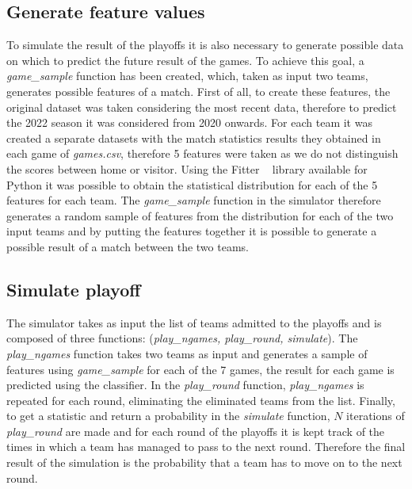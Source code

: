 \documentclass{article}
\begin{document}
\subsection{Generate feature values}
To simulate the result of the playoffs it is also necessary to generate possible data on which to predict the future result of the games. To achieve this goal, a \emph{game\_sample} function has been created, which, taken as input two teams, generates possible features of a match. First of all, to create these features, the original dataset was taken considering the most recent data, therefore to predict the 2022 season it was considered from 2020 onwards. For each team it was created a separate datasets with the match statistics results they obtained in each game of \emph{games.csv}, therefore 5 features were taken as we do not distinguish the scores between home or visitor. Using the Fitter ~\cite{Fitter} library available for Python it was possible to obtain the statistical distribution for each of the 5 features for each team. The \emph{game\_sample} function in the simulator therefore generates a random sample of features from the distribution for each of the two input teams and by putting the features together it is possible to generate a possible result of a match between the two teams.
\subsection{Simulate playoff}
The simulator takes as input the list of teams admitted to the playoffs and is composed of three functions: (\emph{play\_ngames, play\_round, simulate}). The \emph{play\_ngames} function takes two teams as input and generates a sample of features using \emph{game\_sample} for each of the 7 games, the result for each game is predicted using the classifier. In the \emph{play\_round} function, \emph{play\_ngames} is repeated for each round, eliminating the eliminated teams from the list. Finally, to get a statistic and return a probability in the \emph{simulate} function, $N$ iterations of \emph{play\_round} are made and for each round of the playoffs it is kept track of the times in which a team has managed to pass to the next round. Therefore the final result of the simulation is the probability that a team has to move on to the next round.
\end{document}
